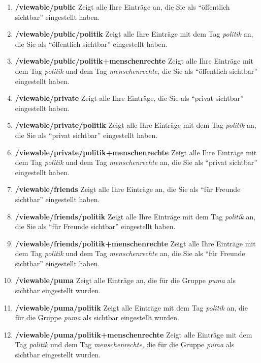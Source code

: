\begin{enumerate}
    \item \textbf{/viewable/public} \newline
    Zeigt alle Ihre Einträge an, die Sie als \enquote{öffentlich sichtbar} eingestellt haben.
    \item \textbf{/viewable/public/politik} \newline
    Zeigt alle Ihre Einträge mit dem Tag \textit{politik} an, die Sie als \enquote{öffentlich sichtbar} eingestellt haben.
    \item \textbf{/viewable/public/politik+menschenrechte} \newline
    Zeigt alle Ihre Einträge mit dem Tag \textit{politik} und dem Tag \textit{menschenrechte}, die Sie als \enquote{öffentlich sichtbar} eingestellt haben.
    \item \textbf{/viewable/private} \newline
    Zeigt alle Ihre Einträge, die Sie als \enquote{privat sichtbar} eingestellt haben.
    \item \textbf{/viewable/private/politik} \newline
    Zeigt alle Ihre Einträge mit dem Tag \textit{politik} an, die Sie als \enquote{privat sichtbar} eingestellt haben.
    \item \textbf{/viewable/private/politik+menschenrechte} \newline
    Zeigt alle Ihre Einträge mit dem Tag \textit{politik} und dem Tag \textit{menschenrechte} an, die Sie als \enquote{privat sichtbar} eingestellt haben.
    \item \textbf{/viewable/friends} \newline
    Zeigt alle Ihre Einträge an, die Sie als \enquote{für Freunde sichtbar} eingestellt haben.
    \item \textbf{/viewable/friends/politik} \newline
    Zeigt alle Ihre Einträge mit dem Tag \textit{politik} an, die Sie als \enquote{für Freunde sichtbar} eingestellt haben.
    \item \textbf{/viewable/friends/politik+menschenrechte} \newline
    Zeigt alle Ihre Einträge mit dem Tag \textit{politik} und dem Tag \textit{menschenrechte} an, die Sie als \enquote{für Freunde sichtbar} eingestellt haben.
    \item \textbf{/viewable/puma} \newline
    Zeigt alle Einträge an, die für die Gruppe \textit{puma} als sichtbar eingestellt wurden.
    \item \textbf{/viewable/puma/politik} \newline
    Zeigt alle Einträge mit dem Tag \textit{politik} an, die für die Gruppe \textit{puma} als sichtbar eingestellt wurden.
    \item \textbf{/viewable/puma/politik+menschenrechte} \newline
    Zeigt alle Einträge mit dem Tag \textit{politik} und dem Tag \textit{menschenrechte}, die für die Gruppe \textit{puma} als sichtbar eingestellt wurden.
\end{enumerate}
